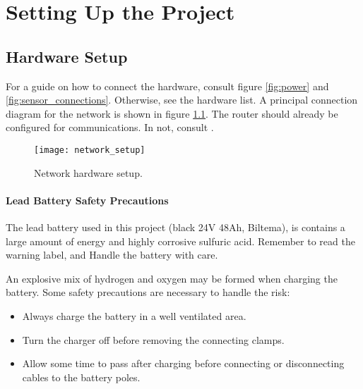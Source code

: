 \chapter{Setting Up the Project}

\section{Hardware Setup}

For a guide on how to connect the hardware, consult figure \ref{fig:power} and \ref{fig:sensor_connections}. Otherwise, see the hardware list. A principal connection diagram for the network is shown in figure \ref{fig:network_setup}. The router should already be configured for communications. In not, consult \cite{aspunvik}.

\begin{figure}[h]
	\centering
	\texttt{[image: network\_setup]}
	\caption{Network hardware setup. }
	\label{fig:network_setup}
\end{figure}

\subsubsection{Lead Battery Safety Precautions}

The lead battery used in this project (black 24V 48Ah, Biltema), is contains a large amount of energy and highly corrosive sulfuric acid. Remember to read the warning label, and Handle the battery with care. 

An explosive mix of hydrogen and oxygen may be formed when charging the battery. Some safety precautions are necessary to handle the risk:

\begin{itemize}
	\item Always charge the battery in a well ventilated area. 
	\item Turn the charger off before removing the connecting clamps.
	\item Allow some time to pass after charging before connecting or disconnecting cables to the battery poles.
\end{itemize} 

